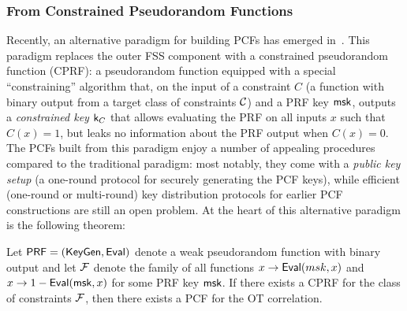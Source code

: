 \subsubsection{From Constrained Pseudorandom Functions}

Recently, an alternative paradigm for building PCFs has emerged in~\cite{EC:BCMPR24,AC:CDDKS24}. This paradigm replaces the outer FSS component with a constrained pseudorandom function (CPRF): a pseudorandom function equipped with a special ``constraining'' algorithm that, on the input of a constraint $C$ (a function with binary output from a target class of constraints $\mathcal{C}$) and a PRF key $\mathsf{msk}$, outputs a \emph{constrained key} $\mathsf{k}_C$ that allows evaluating the PRF on all inputs $x$ such that $C(x) = 1$, but leaks no information about the PRF output when $C(x)=0$. The PCFs built from this paradigm enjoy a number of appealing procedures compared to the traditional paradigm: most notably, they come with a \emph{public key setup} (a one-round protocol for securely generating the PCF keys), while efficient (one-round or multi-round) key distribution protocols for earlier PCF constructions are still an open problem. At the heart of this alternative paradigm is the following theorem:

\begin{theorem}
Let $\mathsf{PRF} = (\mathsf{KeyGen},\mathsf{Eval})$ denote a weak pseudorandom function with binary output and let $\mathcal{F}$ denote the family of all functions $x\to \mathsf{Eval}(msk,x)$ and $x\to 1-\mathsf{Eval}(\mathsf{msk},x)$ for some PRF key $\mathsf{msk}$. If there exists a CPRF for the class of constraints $\mathcal{F}$, then there exists a PCF for the OT correlation.
\end{theorem}

